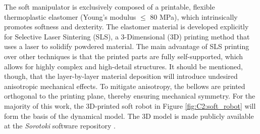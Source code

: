 \begin{rmk} The soft manipulator is exclusively composed of a printable, flexible thermoplastic elastomer (Young's modulus $\le$ 80 \si{\mega \pascal}), which intrinsically promotes softness and dexterity. The elastomer material is developed explicitly for Selective Laser Sintering (SLS), a 3-Dimensional (3D) printing method that uses a laser to solidify powdered material. The main advantage of SLS printing over other techniques is that the printed parts are fully self-supported, which allows for highly complex and high-detail structures. It should be mentioned, though, that the layer-by-layer material deposition will introduce undesired anisotropic mechanical effects. To mitigate anisotropy, the bellows are printed orthogonal to the printing plane, thereby ensuring mechanical symmetry. For the majority of this work, the 3D-printed soft robot in Figure \ref{fig:C2:soft_robot} will form the basis of the dynamical model. The 3D model is made publicly available at the \textit{Sorotoki} software repository \cite{Caasenbrood2020}. 
\end{rmk}

